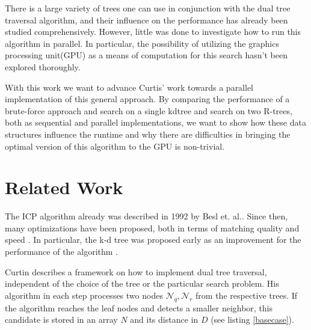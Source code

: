 \documentclass{utue} %
\begin{document}
There is a large variety of trees one can use in conjunction with the dual tree traversal algorithm, and their influence on the performance has already been studied comprehensively. However, little was done to investigate how to run this algorithm in parallel. In particular, the possibility of utilizing the graphics processing unit(GPU) as a means of computation for this search hasn't been explored thoroughly.

With this work we want to advance Curtis' work \cite{improving} towards a parallel implementation of this general approach. By comparing the performance of a brute-force approach and search on a single kdtree and search on two R-trees, both as sequential and parallel implementations, we want to show how these data structures influence the runtime and why there are difficulties in bringing the optimal version of this algorithm to the GPU is non-trivial.
\section{Related Work} 

The ICP algorithm already was described in 1992 by Besl et. al.\cite{icp}. Since then, many optimizations have been proposed, both in terms of matching quality and speed \cite{comparison}. In particular, the k-d tree was proposed early as an improvement for the performance of the algorithm \cite{simon1996fast}.

Curtin describes a framework on how to implement dual tree traversal, independent of the choice of the tree or the particular search problem\cite{improving}. His algorithm in each step processes two nodes $\mathscr{N}_q,\mathscr{N}_r$ from the respective trees. If the algorithm reaches the leaf nodes and detects a smaller neighbor, this candidate is stored in an array $N$ and its distance in $D$ (see listing \ref{basecase}).
\end{document}
